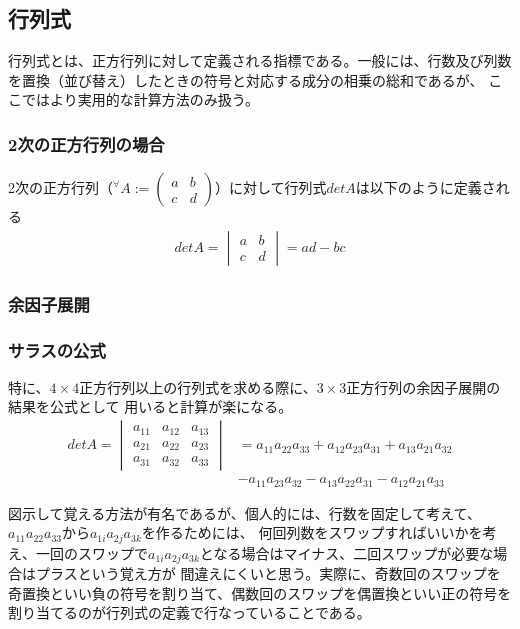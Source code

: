 \documentclass[10pt]{ujarticle}
\begin{document}
\subsection{行列式}
行列式とは、正方行列に対して定義される指標である。一般には、行数及び列数を置換（並び替え）したときの符号と対応する成分の相乗の総和であるが、
ここではより実用的な計算方法のみ扱う。

\subsubsection{2次の正方行列の場合}
2次の正方行列（$^\forall A:=(\begin{smallmatrix}a&b\\c&d\end{smallmatrix})$）に対して行列式$detA$は以下のように定義される
$$
\begin{aligned}
  detA=\begin{vmatrix} a & b\\ c & d \end{vmatrix}=ad-bc
\end{aligned}
$$
\subsubsection{余因子展開}

\subsubsection{サラスの公式}
特に、$4\times 4$正方行列以上の行列式を求める際に、$3\times 3$正方行列の余因子展開の結果を公式として
用いると計算が楽になる。
$$
\begin{aligned}
  detA=\begin{vmatrix}
    a_{11} & a_{12} & a_{13}\\
    a_{21} & a_{22} & a_{23}\\
    a_{31} & a_{32} & a_{33}
  \end{vmatrix}&=a_{11}a_{22}a_{33}+a_{12}a_{23}a_{31}+a_{13}a_{21}a_{32}\\
  &-a_{11}a_{23}a_{32}-a_{13}a_{22}a_{31}-a_{12}a_{21}a_{33}
\end{aligned}
$$

図示して覚える方法が有名であるが、個人的には、行数を固定して考えて、$a_{11}a_{22}a_{33}$から$a_{1i}a_{2j}a_{3k}$を作るためには、
何回列数をスワップすればいいかを考え、一回のスワップで$a_{1i}a_{2j}a_{3k}$となる場合はマイナス、二回スワップが必要な場合はプラスという覚え方が
間違えにくいと思う。実際に、奇数回のスワップを奇置換といい負の符号を割り当て、偶数回のスワップを偶置換といい正の符号を割り当てるのが行列式の定義で行なっていることである。
\end{document}
